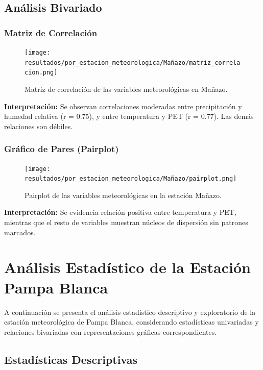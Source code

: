 \subsection{Análisis Bivariado}

\subsubsection*{Matriz de Correlación}
\begin{figure}[htbp]
\centering
\texttt{[image: resultados/por\_estacion\_meteorologica/Mañazo/matriz\_correlacion.png]}
\caption{Matriz de correlación de las variables meteorológicas en Mañazo.}
\label{fig:manazo_corr}
\end{figure}
\textbf{Interpretación:} Se observan correlaciones moderadas entre precipitación y humedad relativa (r = 0.75), y entre temperatura y PET (r = 0.77). Las demás relaciones son débiles.

\subsubsection*{Gráfico de Pares (Pairplot)}
\begin{figure}[htbp]
\centering
\texttt{[image: resultados/por\_estacion\_meteorologica/Mañazo/pairplot.png]}
\caption{Pairplot de las variables meteorológicas en la estación Mañazo.}
\label{fig:manazo_pairplot}
\end{figure}
\textbf{Interpretación:} Se evidencia relación positiva entre temperatura y PET, mientras que el resto de variables muestran núcleos de dispersión sin patrones marcados.


\section{Análisis Estadístico de la Estación Pampa Blanca}

A continuación se presenta el análisis estadístico descriptivo y exploratorio de la estación meteorológica de Pampa Blanca, considerando estadísticas univariadas y relaciones bivariadas con representaciones gráficas correspondientes.

\subsection{Estadísticas Descriptivas}

